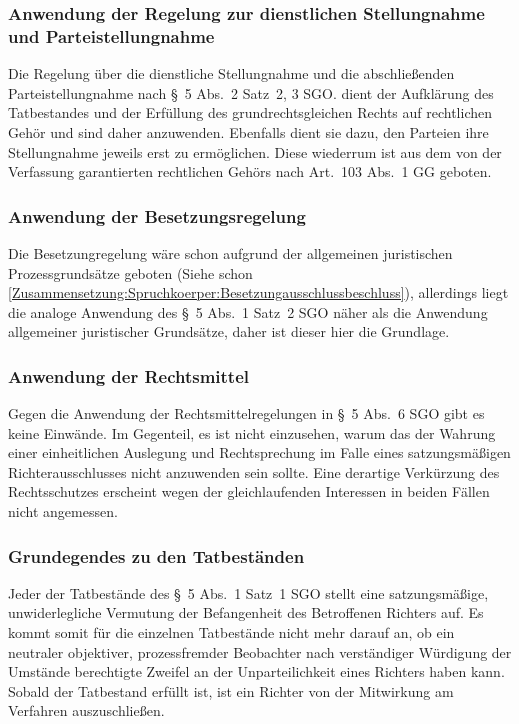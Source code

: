 \subsubsection{Anwendung der Regelung zur dienstlichen Stellungnahme und Parteistellungnahme}
\label{Zusammensetzung:Spruchkoerper:Befangenheitsvermutung:Stellungnahme}
Die Regelung über die dienstliche Stellungnahme und die abschließenden Parteistellungnahme nach \S~5 Abs.~2 Satz~2, 3 SGO. dient der Aufklärung des Tatbestandes und der Erfüllung des grundrechtsgleichen Rechts auf rechtlichen Gehör und sind daher anzuwenden.
Ebenfalls dient sie dazu, den Parteien ihre Stellungnahme jeweils erst zu ermöglichen.
Diese wiederrum ist aus dem von der Verfassung garantierten rechtlichen Gehörs nach Art.~103 Abs.~1 GG geboten.

\subsubsection{Anwendung der Besetzungsregelung}
\label{Zusammensetzung:Spruchkoerper:Befangenheitsvermutung:Besetzung}
Die Besetzungregelung wäre schon aufgrund der allgemeinen juristischen Prozessgrundsätze geboten (Siehe schon \ref{Zusammensetzung:Spruchkoerper:Besetzungausschlussbeschluss}), allerdings liegt die analoge Anwendung des \S~5 Abs.~1 Satz~2 SGO näher als die Anwendung allgemeiner juristischer Grundsätze, daher ist dieser hier die Grundlage.

\subsubsection{Anwendung der Rechtsmittel}
\label{Zusammensetzung:Spruchkoerper:Befangenheitsvermutung:Rechtsmittel}
Gegen die Anwendung der Rechtsmittelregelungen in \S~5 Abs.~6 SGO gibt es keine Einwände. Im Gegenteil, es ist nicht einzusehen, warum das der Wahrung einer einheitlichen Auslegung und Rechtsprechung im Falle eines satzungsmäßigen Richterausschlusses nicht anzuwenden sein sollte.
Eine derartige Verkürzung des Rechtsschutzes erscheint wegen der gleichlaufenden Interessen in beiden Fällen nicht angemessen.

\subsubsection{Grundegendes zu den Tatbeständen}
\label{Zusammensetzung:Spruchkoerper:Befangenheitsvermutung:Tatbestandsgrundsaetze}
Jeder der Tatbestände des \S~5 Abs.~1 Satz~1 SGO stellt eine satzungsmäßige, unwiderlegliche Vermutung der Befangenheit des Betroffenen Richters auf.
Es kommt somit für die einzelnen Tatbestände nicht mehr darauf an, ob ein neutraler objektiver, prozessfremder Beobachter nach verständiger Würdigung der Umstände berechtigte Zweifel an der Unparteilichkeit eines Richters haben kann.
Sobald der Tatbestand erfüllt ist, ist ein Richter von der Mitwirkung am Verfahren auszuschließen.

